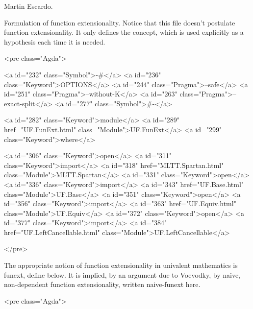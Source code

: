 Martin Escardo.

Formulation of function extensionality. Notice that this file doesn't
postulate function extensionality. It only defines the concept, which
is used explicitly as a hypothesis each time it is needed.

<pre class="Agda">

<a id="232" class="Symbol">{-#</a> <a id="236" class="Keyword">OPTIONS</a> <a id="244" class="Pragma">--safe</a> <a id="251" class="Pragma">--without-K</a> <a id="263" class="Pragma">--exact-split</a> <a id="277" class="Symbol">#-}</a>

<a id="282" class="Keyword">module</a> <a id="289" href="UF.FunExt.html" class="Module">UF.FunExt</a> <a id="299" class="Keyword">where</a>

<a id="306" class="Keyword">open</a> <a id="311" class="Keyword">import</a> <a id="318" href="MLTT.Spartan.html" class="Module">MLTT.Spartan</a>
<a id="331" class="Keyword">open</a> <a id="336" class="Keyword">import</a> <a id="343" href="UF.Base.html" class="Module">UF.Base</a>
<a id="351" class="Keyword">open</a> <a id="356" class="Keyword">import</a> <a id="363" href="UF.Equiv.html" class="Module">UF.Equiv</a>
<a id="372" class="Keyword">open</a> <a id="377" class="Keyword">import</a> <a id="384" href="UF.LeftCancellable.html" class="Module">UF.LeftCancellable</a>

</pre>

The appropriate notion of function extensionality in univalent
mathematics is funext, define below. It is implied, by an argument due
to Voevodky, by naive, non-dependent function extensionality, written
naive-funext here.

<pre class="Agda">

